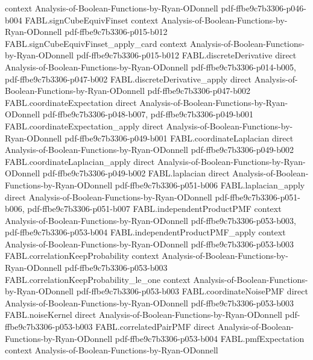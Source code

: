 \begin{theorem}
  {context}
  {Analysis-of-Boolean-Functions-by-Ryan-ODonnell}
  {pdf-ffbe9c7b3306-p046-b004}
\proofstep
  {FABL.signCubeEquivFinset}
  {context}
  {Analysis-of-Boolean-Functions-by-Ryan-ODonnell}
  {pdf-ffbe9c7b3306-p015-b012}
\proofstep
  {FABL.signCubeEquivFinset_apply_card}
  {context}
  {Analysis-of-Boolean-Functions-by-Ryan-ODonnell}
  {pdf-ffbe9c7b3306-p015-b012}
\proofstep
  {FABL.discreteDerivative}
  {direct}
  {Analysis-of-Boolean-Functions-by-Ryan-ODonnell}
  {pdf-ffbe9c7b3306-p014-b005,
    pdf-ffbe9c7b3306-p047-b002}
\proofstep
  {FABL.discreteDerivative_apply}
  {direct}
  {Analysis-of-Boolean-Functions-by-Ryan-ODonnell}
  {pdf-ffbe9c7b3306-p047-b002}
\proofstep
  {FABL.coordinateExpectation}
  {direct}
  {Analysis-of-Boolean-Functions-by-Ryan-ODonnell}
  {pdf-ffbe9c7b3306-p048-b007,
    pdf-ffbe9c7b3306-p049-b001}
\proofstep
  {FABL.coordinateExpectation_apply}
  {direct}
  {Analysis-of-Boolean-Functions-by-Ryan-ODonnell}
  {pdf-ffbe9c7b3306-p049-b001}
\proofstep
  {FABL.coordinateLaplacian}
  {direct}
  {Analysis-of-Boolean-Functions-by-Ryan-ODonnell}
  {pdf-ffbe9c7b3306-p049-b002}
\proofstep
  {FABL.coordinateLaplacian_apply}
  {direct}
  {Analysis-of-Boolean-Functions-by-Ryan-ODonnell}
  {pdf-ffbe9c7b3306-p049-b002}
\proofstep
  {FABL.laplacian}
  {direct}
  {Analysis-of-Boolean-Functions-by-Ryan-ODonnell}
  {pdf-ffbe9c7b3306-p051-b006}
\proofstep
  {FABL.laplacian_apply}
  {direct}
  {Analysis-of-Boolean-Functions-by-Ryan-ODonnell}
  {pdf-ffbe9c7b3306-p051-b006,
    pdf-ffbe9c7b3306-p051-b007}
\proofstep
  {FABL.independentProductPMF}
  {context}
  {Analysis-of-Boolean-Functions-by-Ryan-ODonnell}
  {pdf-ffbe9c7b3306-p053-b003,
    pdf-ffbe9c7b3306-p053-b004}
\proofstep
  {FABL.independentProductPMF_apply}
  {context}
  {Analysis-of-Boolean-Functions-by-Ryan-ODonnell}
  {pdf-ffbe9c7b3306-p053-b003}
\proofstep
  {FABL.correlationKeepProbability}
  {context}
  {Analysis-of-Boolean-Functions-by-Ryan-ODonnell}
  {pdf-ffbe9c7b3306-p053-b003}
\proofstep
  {FABL.correlationKeepProbability_le_one}
  {context}
  {Analysis-of-Boolean-Functions-by-Ryan-ODonnell}
  {pdf-ffbe9c7b3306-p053-b003}
\proofstep
  {FABL.coordinateNoisePMF}
  {direct}
  {Analysis-of-Boolean-Functions-by-Ryan-ODonnell}
  {pdf-ffbe9c7b3306-p053-b003}
\proofstep
  {FABL.noiseKernel}
  {direct}
  {Analysis-of-Boolean-Functions-by-Ryan-ODonnell}
  {pdf-ffbe9c7b3306-p053-b003}
\proofstep
  {FABL.correlatedPairPMF}
  {direct}
  {Analysis-of-Boolean-Functions-by-Ryan-ODonnell}
  {pdf-ffbe9c7b3306-p053-b004}
\proofstep
  {FABL.pmfExpectation}
  {context}
  {Analysis-of-Boolean-Functions-by-Ryan-ODonnell}

\end{theorem}
